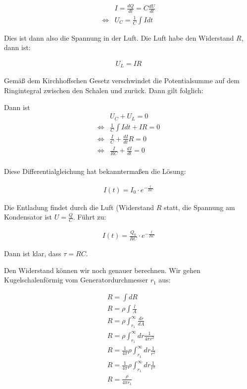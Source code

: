 \documentclass[a4paper,german,12pt,smallheadings]{scrartcl}
\begin{document}
\begin{align*}
  &I = \frac{dQ}{dt} = C \frac{dU}{dt} \\
  \Leftrightarrow &U_C = \frac{1}{C} \int I dt
\end{align*}

Dies ist dann also die Spannung in der Luft. Die Luft habe den Widerstand $R$, dann ist:

\begin{align*}
  U_L = IR
\end{align*}

Gemäß dem Kirchhoffschen Gesetz verschwindet die Potentialsumme auf dem
Ringintegral zwischen den Schalen und zurück. Dann gilt folglich:

Dann ist
\begin{align*}
  &U_C + U_L = 0 \\
  \Leftrightarrow &\frac{1}{C} \int I dt + IR = 0 \\
  \Leftrightarrow &\frac{I}{C} + \frac{dI}{dt} R = 0 \\
  \Leftrightarrow &\frac{I}{RC} + \frac{dI}{dt} = 0 \\
\end{align*}

Diese Differentialgleichung hat bekanntermaßen die Lösung:

\begin{align*}
  I(t) = I_0 \cdot e^{-\frac{t}{RC}}
\end{align*}

Die Entladung findet durch die Luft (Widerstand $R$ statt, die Spannung am
Kondensator ist $U = \frac{Q}{C}$. Führt zu:

\begin{align*}
  I(t) = \frac{Q_0}{RC} \cdot e^{-\frac{t}{RC}}
\end{align*}

Dann ist klar, dass $\tau = RC$.

Den Widerstand können wir noch genauer berechnen. Wir gehen Kugelschalenförmig vom Generatordurchmesser $r_1$ aus:

\begin{align*}
  &R = \int dR \\
  &R = \rho \int \frac{l}{A} \\
  &R = \rho \int_{r_1}^\infty \frac{dr}{dA} \\
  &R = \rho \int_{r_1}^\infty dr \frac{1}{4 \pi r^2} \\
  &R = \frac{1}{4 \pi}\rho \int_{r_1}^\infty dr \frac{1}{r^2} \\
  &R = \frac{1}{4 \pi}\rho \int_{r_1}^\infty dr \frac{1}{r^2} \\
  &R = \frac{\rho}{4 \pi r_1}
\end{align*}
\end{document}
